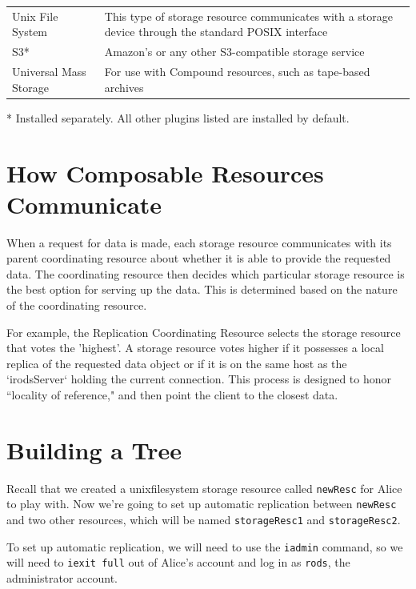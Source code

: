\documentclass[10pt,oneside]{memoir}
\begin{document}
\begin{center}
\def\arraystretch{1.5}%
\begin{tabular}{ |l|p{10cm}| }
\hline
Unix File System & This type of storage resource communicates with a storage device through the standard POSIX interface \\
S3* & Amazon's or any other S3-compatible storage service \\
Universal Mass Storage & For use with Compound resources, such as tape-based archives \\
\hline
\end{tabular}
\end{center}
\footnotesize\vspace{-5mm}\hspace{3mm}* Installed separately. All other plugins listed are installed by default.
\normalsize

\section{How Composable Resources Communicate}

When a request for data is made, each storage resource communicates with its parent coordinating resource about whether it is able to provide the requested data. The coordinating resource then decides which particular storage resource is the best option for serving up the data. This is determined based on the nature of the coordinating resource.

For example, the Replication Coordinating Resource selects the storage resource that votes the 'highest'.  A storage resource votes higher if it possesses a local replica of the requested data object or if it is on the same host as the `irodsServer` holding the current connection. This process is designed to honor ``locality of reference," and then point the client to the closest data.

\section{Building a Tree}

Recall that we created a unixfilesystem storage resource called \texttt{newResc} for Alice to play with. Now we're going to set up automatic replication between \texttt{newResc} and two other resources, which will be named \texttt{storageResc1} and \texttt{storageResc2}.

To set up automatic replication, we will need to use the \texttt{iadmin} command, so we will need to \texttt{iexit full} out of Alice's account and log in as \texttt{rods}, the administrator account.
\end{document}
